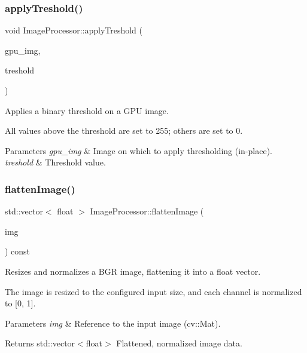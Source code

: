 \subsubsection{\texorpdfstring{apply\+Treshold()}{applyTreshold()}}
{\footnotesize\ttfamily void Image\+Processor\+::apply\+Treshold (\begin{DoxyParamCaption}\item[{cv\+::cuda\+::\+Gpu\+Mat \&}]{gpu\+\_\+img,  }\item[{int}]{treshold }\end{DoxyParamCaption})}



Applies a binary threshold on a G\+PU image. 

All values above the threshold are set to 255; others are set to 0.


\begin{DoxyParams}{Parameters}
{\em gpu\+\_\+img} & Image on which to apply thresholding (in-\/place). \\
\hline
{\em treshold} & Threshold value. \\
\hline
\end{DoxyParams}
\mbox{\label{classImageProcessor_a9e6ce929aa19b3dc53d855ce0f68a2f6}} 
\subsubsection{\texorpdfstring{flatten\+Image()}{flattenImage()}}
{\footnotesize\ttfamily std\+::vector$<$ float $>$ Image\+Processor\+::flatten\+Image (\begin{DoxyParamCaption}\item[{cv\+::\+Mat \&}]{img }\end{DoxyParamCaption}) const}



Resizes and normalizes a B\+GR image, flattening it into a float vector. 

The image is resized to the configured input size, and each channel is normalized to \mbox{[}0, 1\mbox{]}.


\begin{DoxyParams}{Parameters}
{\em img} & Reference to the input image (cv\+::\+Mat). \\
\hline
\end{DoxyParams}
\begin{DoxyReturn}{Returns}
std\+::vector$<$float$>$ Flattened, normalized image data. 
\end{DoxyReturn}
\mbox{\label{classImageProcessor_aaceb6004986b3c9c61084531dbb12011}} 
